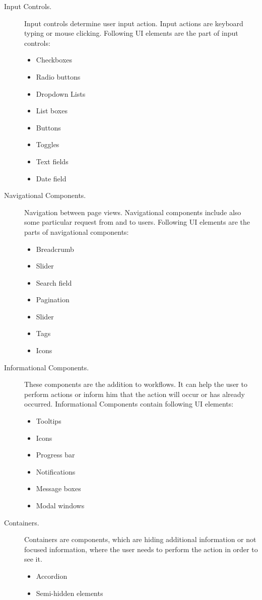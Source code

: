 \begin{description}
\item[Input Controls.] Input controls determine user input action. Input actions are keyboard typing or mouse clicking. Following UI elements are the part of input controls: 
\begin{itemize}
\item Checkboxes
\item Radio buttons 
\item Dropdown Lists
\item List boxes
\item Buttons
\item Toggles
\item Text fields
\item Date field
\end{itemize}
\item[Navigational Components.] Navigation between page views. Navigational components include also some particular request from and to users. Following UI elements are the parts of navigational components:
\begin{itemize}
\item Breadcrumb 
\item Slider
\item Search field
\item Pagination
\item Slider
\item Tags
\item Icons
\end{itemize}
\item[Informational Components.] These components are the addition to workflows. It can help the user to perform actions or inform him that the action will occur or has already occurred. Informational Components contain following UI elements:
\begin{itemize}
\item Tooltips
\item Icons
\item Progress bar
\item Notifications
\item Message boxes
\item Modal windows
\end{itemize}
\item[Containers.] Containers are components, which are hiding additional information or not focused information, where the user needs to perform the action in order to see it.   
\begin{itemize}
\item Accordion
\item Semi-hidden elements
\end{itemize}
\end{description}

